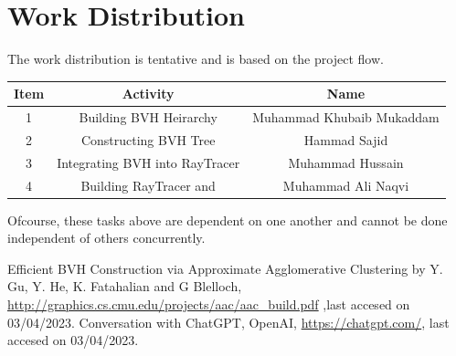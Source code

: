 \documentclass{article}
\begin{document}
\newpage
\section{Work Distribution}
The work distribution is tentative and is based on the project flow.
\begin{center}
  \begin{table}[h]
    \centering
    \begin{tabular}{|c|c|c|}
      \hline
      Item & Activity                       & Name                      \\ \hline
      1    & Building BVH Heirarchy         & Muhammad Khubaib Mukaddam \\ \hline
      2    & Constructing BVH Tree          & Hammad Sajid              \\ \hline
      3    & Integrating BVH into RayTracer & Muhammad Hussain          \\ \hline
      4    & Building RayTracer and         & Muhammad Ali Naqvi        \\ \hline
    \end{tabular}

    \label{tab:my-table6}
  \end{table}
\end{center}
Ofcourse, these tasks above are dependent on one another and cannot be done independent of others concurrently.

\begin{thebibliography}{9}
  Efficient BVH Construction via Approximate Agglomerative Clustering
  by Y. Gu, Y. He, K. Fatahalian and G Blelloch, \url{http://graphics.cs.cmu.edu/projects/aac/aac_build.pdf} ,last accesed on 03/04/2023.
  Conversation with ChatGPT, OpenAI, \url{https://chatgpt.com/}, last accesed on 03/04/2023.
\end{thebibliography}
\end{document}
